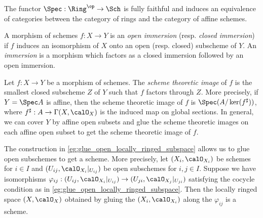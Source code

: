     \begin{theorem}\label{thm:equivalence_between_rings_and_affine_schemes}
        The functor \(\Spec : \Ring^{\op} \to \Sch\) is fully faithful and induces an equivalence of categories between the category of rings and the category of affine schemes.
    \end{theorem}

    \begin{definition}\label{def:open_and_closed_immersion}
        A morphism of schemes \(f : X \to Y\) is an \emph{open immersion} (resp. \emph{closed immersion}) if \(f\) induces an isomorphism of \(X\) onto an open (resp. closed) subscheme of \(Y\).
        An \emph{immersion} is a morphism which factors as a closed immersion followed by an open immersion.
    \end{definition}

    \begin{definition}\label{def:scheme_theoretic_image}
        Let \(f : X \to Y\) be a morphism of schemes.
        The \emph{scheme theoretic image} of \(f\) is the smallest closed subscheme \(Z\) of \(Y\) such that \(f\) factors through \(Z\).
        More precisely, if \(Y = \Spec A\) is affine, then the scheme theoretic image of \(f\) is \(\Spec(A/\ker(f^\sharp))\), where \(f^\sharp : A \to \Gamma(X, \calO_X)\) is the induced map on global sections.
        In general, we can cover \(Y\) by affine open subsets and glue the scheme theoretic images on each affine open subset to get the scheme theoretic image of \(f\).
    \end{definition}


    \begin{example}\label{eg:glue_open_subschemes}
        The construction in \cref{eg:glue_open_locally_ringed_subspace} allows us to glue open subschemes to get a scheme.
        More precisely, let \((X_i, \calO_{X_i})\) be schemes for \(i \in I\) and \((U_{ij}, \calO_{X_i}|_{U_{ij}})\) be open subschemes for \(i,j \in I\).
        Suppose we have isomorphisms \(\varphi_{ij} : (U_{ij}, \calO_{X_i}|_{U_{ij}}) \to (U_{ji}, \calO_{X_j}|_{U_{ji}})\) satisfying the cocycle condition as in \cref{eg:glue_open_locally_ringed_subspace}.
        Then the locally ringed space \((X, \calO_X)\) obtained by gluing the \((X_i, \calO_{X_i})\) along the \(\varphi_{ij}\) is a scheme.
    \end{example}

